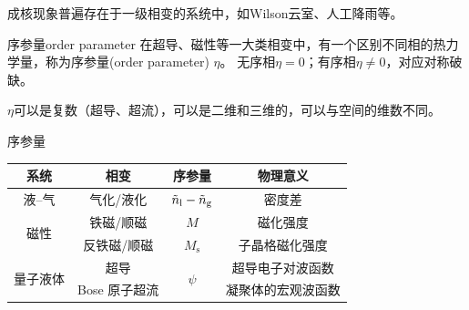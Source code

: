 成核现象普遍存在于一级相变的系统中，如Wilson云室、人工降雨等。






\begin{definition}
	{序参量}{order parameter}
	在超导、磁性等一大类相变中，有一个区别不同相的热力学量，称为序参量(order parameter) $\eta$。
	无序相$\eta = 0$；有序相$\eta \neq 0$，对应对称破缺。
\end{definition}

\begin{remark}
	$\eta$可以是复数（超导、超流），可以是二维和三维的，可以与空间的维数不同。
\end{remark}

\begin{example}
	{序参量}{}
	\begin{notecaptionblock}
		\begin{tabular}{cccc}
			\toprule
			系统 & 相变 & 序参量 & 物理意义 \\
			\hline
			液--气 & 气化/液化 & $\tilde n_\mathrm l - \tilde n_\mathrm g$ & 密度差 \\
			\multirow{2}{*}{磁性} & 铁磁/顺磁 & $M$ & 磁化强度 \\
			& 反铁磁/顺磁 & $M_{\mathrm{s}}$ & 子晶格磁化强度 \\
			\multirow{2}{*}{量子液体} & 超导 & \multirow{2}{*}{$\psi$} & 超导电子对波函数 \\
			 & Bose 原子超流 & & 凝聚体的宏观波函数 \\
			\bottomrule
		\end{tabular}
		\label{tab:order parameter}
	\end{notecaptionblock}
\end{example}

